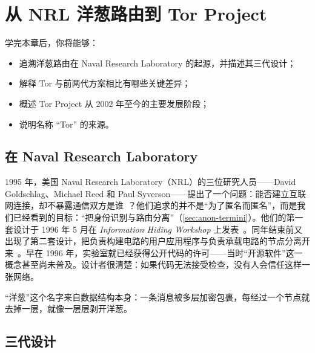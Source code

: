 \chapter{从 NRL 洋葱路由到 Tor Project}\label{cap:03-nascita-tor}

\begin{obiettivi}
学完本章后，你将能够：
\begin{itemize}[nosep]
  \item 追溯洋葱路由在 Naval Research Laboratory 的起源，并描述其三代设计；
  \item 解释 Tor 与前两代方案相比有哪些关键差异；
  \item 概述 Tor Project 从 2002 年至今的主要发展阶段；
  \item 说明名称 \enquote{Tor} 的来源。
\end{itemize}
\end{obiettivi}

\section{在 Naval Research Laboratory}\label{sec:nascita-nrl}

1995 年，美国 Naval Research Laboratory（NRL）的三位研究人员——David Goldschlag、Michael Reed 和 Paul Syverson——提出了一个问题：能否建立互联网连接，却不暴露通信双方是谁~\cite{torhistory}？他们追求的并不是“为了匿名而匿名”，而是我们已经看到的目标：\enquote{把身份识别与路由分离}（\cref{sec:anon-termini}）。他们的第一套设计于 1996 年 5 月在 \emph{Information Hiding Workshop} 上发表~\cite{goldschlag1996hiding}。同年结束前又出现了第二套设计，把负责构建电路的用户应用程序与负责承载电路的节点分离开来~\cite{syverson2011peel}。早在 1996 年，实验室就已经获得公开代码的许可——当时“开源软件”这一概念甚至尚未普及。设计者很清楚：如果代码无法接受检查，没有人会信任这样一张网络。

“洋葱”这个名字来自数据结构本身：一条消息被多层加密包裹，每经过一个节点就去掉一层，就像一层层剥开洋葱。

\section{三代设计}\label{sec:nascita-generazioni}

